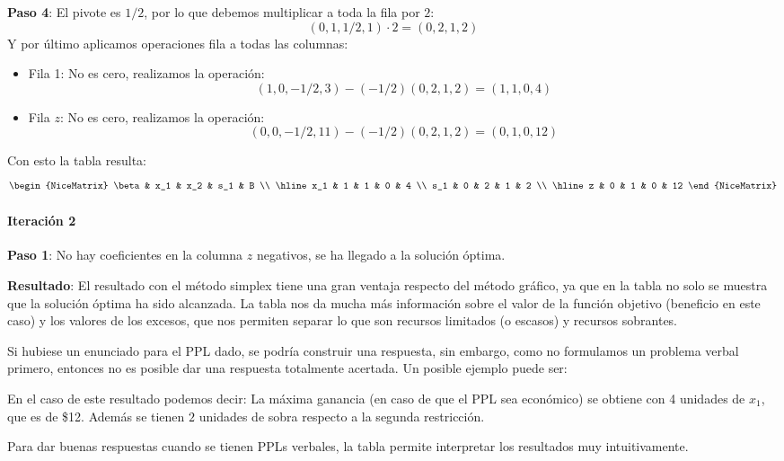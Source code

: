\textbf{Paso 4}: El pivote es \(1/2\), por lo que debemos multiplicar a toda la fila por \(2\):
\[
  (0, 1, 1/2, 1) \cdot 2 = (0, 2, 1, 2)
\]
Y por último aplicamos operaciones fila a todas las columnas:
\begin{itemize}
  \item Fila 1: No es cero, realizamos la operación:
  \[
    (1, 0, -1/2, 3) - (-1/2)(0, 2, 1, 2) = (1, 1, 0, 4)
  \]
  \item Fila \(z\): No es cero, realizamos la operación:
  \[
    (0, 0, -1/2, 11) - (-1/2)(0, 2, 1, 2) = (0, 1, 0, 12)
  \]
\end{itemize}
Con esto la tabla resulta:
\[
  \begin{NiceMatrix}
    \beta & x_1 & x_2 & s_1 & B \\
    \hline
    x_1 & 1 & 1 & 0 & 4 \\
    s_1 & 0 & 2 & 1 & 2 \\
    \hline
    z & 0 & 1 & 0 & 12
  \end{NiceMatrix}
\]

\paragraph{Iteración 2}

\textbf{Paso 1}: No hay coeficientes en la columna \(z\) negativos, se ha llegado a la solución óptima.

\textbf{Resultado}: El resultado con el método simplex tiene una gran ventaja respecto del método gráfico, ya que en la tabla no solo se muestra que la solución óptima ha sido alcanzada. La tabla nos da mucha más información sobre el valor de la función objetivo (beneficio en este caso) y los valores de los excesos, que nos permiten separar lo que son recursos limitados (o escasos) y recursos sobrantes.

Si hubiese un enunciado para el PPL dado, se podría construir una respuesta, sin embargo, como no formulamos un problema verbal primero, entonces no es posible dar una respuesta totalmente acertada. Un posible ejemplo puede ser:

En el caso de este resultado podemos decir: La máxima ganancia (en caso de que el PPL sea económico) se obtiene con 4 unidades de \(x_1\), que es de \$12. Además se tienen \(2\) unidades de sobra respecto a la segunda restricción.

Para dar buenas respuestas cuando se tienen PPLs verbales, la tabla permite interpretar los resultados muy intuitivamente.

